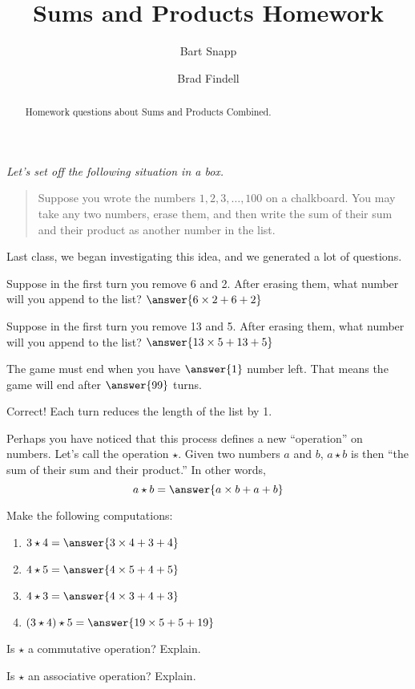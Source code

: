 \documentclass{ximera}
\title{Sums and Products Homework}
\author{Bart Snapp \and Brad Findell}
\begin{document}
\begin{abstract}
Homework questions about Sums and Products Combined. 
\end{abstract}
\maketitle

\emph{Let's set off the following situation in a box.} 
\begin{quote}
Suppose you wrote the numbers $1,2,3,\dots,100$ on a chalkboard. You
may take any two numbers, erase them, and then write the sum of their
sum and their product as another number in the list.
\end{quote}
Last class, we began investigating this idea, and we generated a lot
of questions.  

\begin{problem}
Suppose in the first turn you remove 6 and 2.  After erasing them, what number will you append to the list?  $\answer{6\times 2+6+2}$
\end{problem}

\begin{problem}
Suppose in the first turn you remove 13 and 5.  After erasing them, what number will you append to the list?  $\answer{13\times 5+13+5}$
\end{problem}

\begin{problem}
The game must end when you have $\answer{1}$ number left.  That means the game will end after $\answer{99}$ turns.
\begin{feedback}[correct]
Correct!  Each turn reduces the length of the list by 1.
\end{feedback}
\end{problem}

\begin{problem}
Perhaps you have noticed that this process defines a new ``operation'' on numbers.  Let's
call the operation $\star$.  Given two numbers $a$ and $b$, $a\star b$
is then ``the sum of their sum and their product.''  In other words, 
\[
a\star b = \answer{a\times b+a+b}
\]
\end{problem}

\begin{problem}
Make the following computations:
\begin{enumerate}
\item $3\star 4= \answer{3\times 4+3+4}$
\item $4\star 5= \answer{4\times 5+4+5}$
\item $4\star 3= \answer{4\times 3+4+3}$
\item $(3\star 4)\star 5 = \answer{19\times 5+5+19}$
\end{enumerate}
\end{problem}


\begin{problem}
Is $\star$ a commutative operation?  Explain.  
\begin{freeResponse}
\end{freeResponse}
\end{problem}


\begin{problem}
Is $\star$ an associative operation?  Explain.  
\begin{freeResponse}
\end{freeResponse}
\end{problem}
\end{document}
